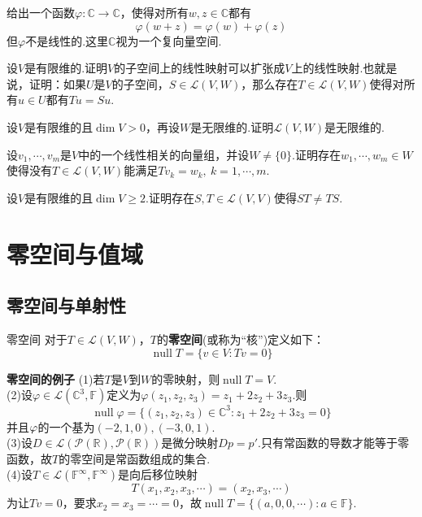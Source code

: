 \documentclass[lang=cn, zihao=5]{elegantbook}
\newcommand{\R}{\mathbb{R}}
\newcommand{\C}{\mathbb{C}}
\newcommand{\F}{\mathbb{F}}
\newcommand{\lmap}{\mathcal{L}}
\DeclareMathOperator{\nul}{null}
\newcommand{\examplefont}[1]{\color{mgreen} \textbf{#1}}
\begin{document}
\begin{exercise}
	给出一个函数$\varphi :\C \to \C$，使得对所有$w,z \in \C$都有$$\varphi (w+z) = \varphi (w) + \varphi (z)$$
	但$\varphi$不是线性的.这里$\C$视为一个复向量空间.
\end{exercise}

\begin{exercise}
	设$V$是有限维的.证明$V$的子空间上的线性映射可以扩张成$V$上的线性映射.也就是说，证明：如果$U$是$V$的子空间，$S \in \lmap (V,W)$，那么存在$T \in \lmap (V,W)$使得对所有$u \in U$都有$Tu=Su$.
\end{exercise}

\begin{exercise}
	设$V$是有限维的且$\dim V>0$，再设$W$是无限维的.证明$\lmap (V,W)$是无限维的.
\end{exercise}

\begin{exercise}
	设$v_1, \cdots ,v_m$是$V$中的一个线性相关的向量组，并设$W \neq \{ 0 \}$.证明存在$w_1, \cdots ,w_m \in W$使得没有$T \in \lmap (V,W)$能满足$Tv_k=w_k,~k=1,\cdots ,m$.
\end{exercise}

\begin{exercise}
	设$V$是有限维的且$\dim V \geq 2$.证明存在$S,T \in \lmap (V,V)$使得$ST \neq TS$.
\end{exercise}

\section{零空间与值域}

\subsection{零空间与单射性}

\begin{definition}{零空间}
	对于$T \in \lmap (V,W)$，$T$的\textbf{零空间}(或称为“核”)定义如下：$$\nul T = \{ v \in V:Tv=0 \}$$
\end{definition}

\begin{example}{\examplefont{零空间的例子}}
	(1)若$T$是$V$到$W$的零映射，则$\nul T=V$. \\
	(2)设$\varphi \in \lmap (\C ^3,\F)$定义为$\varphi (z_1,z_2,z_3)=z_1+2z_2+3z_3$.则$$\nul \varphi = \{ (z_1,z_2,z_3) \in \C ^3 : z_1+2z_2+3z_3=0 \}$$
	并且$\null \varphi$的一个基为$(-2,1,0),(-3,0,1)$. \\
	(3)设$D \in \lmap (\mathcal{P}(\R),\mathcal{P}(\R))$是微分映射$Dp=p'$.只有常函数的导数才能等于零函数，故$T$的零空间是常函数组成的集合. \\
	(4)设$T \in \lmap (\F ^{\infty},\F ^{\infty})$是向后移位映射$$T(x_1,x_2,x_3, \cdots )=(x_2,x_3,\cdots )$$
	为让$Tv=0$，要求$x_2=x_3=\cdots =0$，故$\nul T = \{ (a,0,0,\cdots ) :a \in \F \}$.
\end{example}
\end{document}
